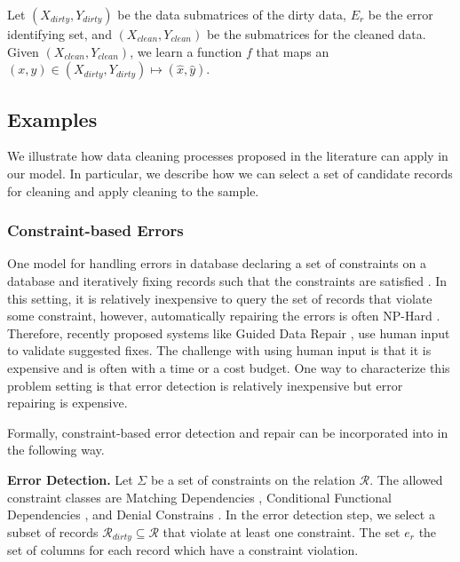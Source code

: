 \begin{problem}\label{imp-est}\sloppy
Let $(X_{dirty},Y_{dirty})$ be the data submatrices of the dirty data, $E_r$ be the error identifying set, and $(X_{clean},Y_{clean})$ be the submatrices for the cleaned data. Given $(X_{clean},Y_{clean})$, we learn a function $f$ that maps an $(x,y) \in (X_{dirty},Y_{dirty}) \mapsto (\hat{x},\hat{y})$.
\end{problem}
\fi

\subsection{Examples}
We illustrate how data cleaning processes proposed in the literature can apply in our model.
In particular, we describe how we can select a set of candidate records for cleaning and apply cleaning to the sample.

\subsubsection{Constraint-based Errors}
One model for handling errors in database declaring a set of constraints on a database and 
iteratively fixing records such that the constraints are satisfied \cite{DBLP:journals/pvldb/YakoutENOI11, DBLP:journals/pvldb/FanLMTY10, khayyat2015bigdansing}.
In this setting, it is relatively inexpensive to query the set of records that violate some constraint, however, automatically repairing the errors is often NP-Hard \cite{DBLP:journals/pvldb/FanLMTY10}.
Therefore, recently proposed systems like Guided Data Repair \cite{DBLP:journals/pvldb/YakoutENOI11}, use human input to validate suggested fixes.
The challenge with using human input is that it is expensive and is often with a time or a cost budget.
One way to characterize this problem setting is that error detection is relatively inexpensive but error repairing is expensive.

Formally, constraint-based error detection and repair can be incorporated into \sys in the following way.

\vspace{0.5em}

\noindent\textbf{Error Detection. } Let $\Sigma$ be a set of constraints on the relation $\mathcal{R}$. 
The allowed constraint classes are Matching Dependencies \cite{bertossi2013data}, Conditional Functional Dependencies \cite{DBLP:journals/pvldb/FanLMTY10}, and Denial Constrains \cite{khayyat2015bigdansing}. 
In the error detection step, we select a subset of records $\mathcal{R}_{dirty} \subseteq \mathcal{R}$ that violate at least one constraint.
The set $e_r$ the set of columns for each record which have a constraint violation.

